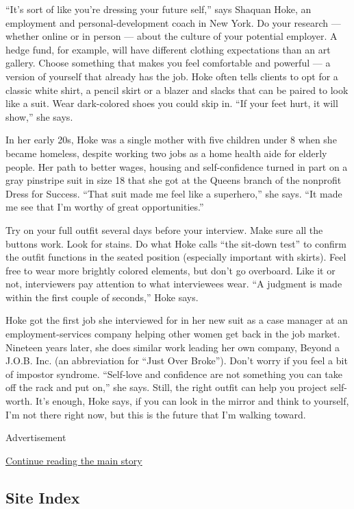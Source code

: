 ``It's sort of like you're dressing your future self,'' says Shaquan
Hoke, an employment and personal-development coach in New York. Do your
research --- whether online or in person --- about the culture of your
potential employer. A hedge fund, for example, will have different
clothing expectations than an art gallery. Choose something that makes
you feel comfortable and powerful --- a version of yourself that already
has the job. Hoke often tells clients to opt for a classic white shirt,
a pencil skirt or a blazer and slacks that can be paired to look like a
suit. Wear dark-colored shoes you could skip in. ``If your feet hurt, it
will show,'' she says.

In her early 20s, Hoke was a single mother with five children under 8
when she became homeless, despite working two jobs as a home health aide
for elderly people. Her path to better wages, housing and
self-confidence turned in part on a gray pinstripe suit in size 18 that
she got at the Queens branch of the nonprofit Dress for Success. ``That
suit made me feel like a superhero,'' she says. ``It made me see that
I'm worthy of great opportunities.''

Try on your full outfit several days before your interview. Make sure
all the buttons work. Look for stains. Do what Hoke calls ``the sit-down
test'' to confirm the outfit functions in the seated position
(especially important with skirts). Feel free to wear more brightly
colored elements, but don't go overboard. Like it or not, interviewers
pay attention to what interviewees wear. ``A judgment is made within the
first couple of seconds,'' Hoke says.

Hoke got the first job she interviewed for in her new suit as a case
manager at an employment-services company helping other women get back
in the job market. Nineteen years later, she does similar work leading
her own company, Beyond a J.O.B. Inc. (an abbreviation for ``Just Over
Broke''). Don't worry if you feel a bit of impostor syndrome.
``Self-love and confidence are not something you can take off the rack
and put on,'' she says. Still, the right outfit can help you project
self-worth. It's enough, Hoke says, if you can look in the mirror and
think to yourself, I'm not there right now, but this is the future that
I'm walking toward.

Advertisement

\protect\hyperlink{after-bottom}{Continue reading the main story}

\hypertarget{site-index}{%
\subsection{Site Index}\label{site-index}}

